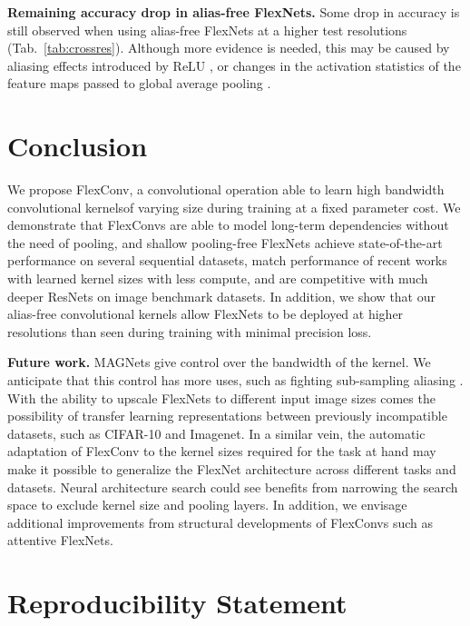 \documentclass{article} \usepackage{iclr2022_conference,times}
\begin{document}
\textbf{Remaining accuracy drop in alias-free FlexNets.} Some drop in accuracy is still observed when using alias-free FlexNets at a higher test resolutions (Tab.~\ref{tab:crossres}). Although more evidence is needed, this may be caused by aliasing effects introduced by $\mathrm{ReLU}$ \citep{vasconcelos2021impact}, or changes in the activation statistics of the feature maps passed to global average pooling \citep{Touvron2019FixingTT}.
\vspace{-2mm}
\section{Conclusion}
\vspace{-2mm}
We propose FlexConv, a convolutional operation able to learn high bandwidth convolutional kernels\break of varying size during training at a fixed parameter cost. We demonstrate that FlexConvs are able to model long-term dependencies without the need of pooling, and shallow pooling-free FlexNets achieve state-of-the-art performance on several sequential datasets, match performance of recent works with learned kernel sizes with less compute, and are competitive with much deeper ResNets on image benchmark datasets. In addition, we show that our alias-free convolutional kernels allow FlexNets to be deployed at higher resolutions than seen during training with minimal precision loss.


\textbf{Future work.} MAGNets give control over the bandwidth of the kernel. We anticipate that this control has more uses, such as fighting sub-sampling aliasing \citep{zhang2019making,Kayhan_2020_CVPR,karras2021alias}. With the ability to upscale FlexNets to different input image sizes comes the possibility of transfer learning representations between previously incompatible datasets, such as CIFAR-10 and Imagenet.
In a similar vein, the automatic adaptation of FlexConv to the kernel sizes required for the task at hand may make it possible to generalize the FlexNet architecture across different tasks and datasets. Neural architecture search \citep{zoph2016neural} could see benefits from narrowing the search space to exclude kernel size and pooling layers. In addition, we envisage additional improvements from structural developments of FlexConvs such as attentive FlexNets.




\section*{Reproducibility Statement}
\end{document}
